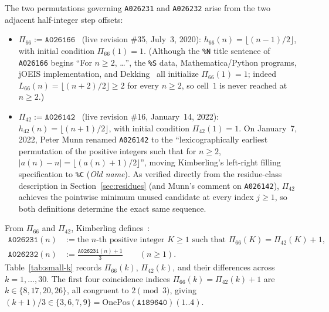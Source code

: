\documentclass[11pt]{article}
\theoremstyle{definition}
\newcommand{\seq}[1]{\texttt{#1}}
\newcommand{\OnePos}{\mathrm{OnePos}}
\begin{document}
The two permutations governing \seq{A026231} and \seq{A026232} arise from the two adjacent half-integer step offsets:
\begin{itemize}
\item $\Pi_{66} := \seq{A026166}$~\cite{oeis026166} (live revision \#35, July~3, 2020): $h_{66}(n) = \lfloor (n - 1)/2 \rfloor$, with initial condition $\Pi_{66}(1) = 1$. (Although the \texttt{\%N} title sentence of \seq{A026166} begins ``For $n \ge 2$, \dots'', the \texttt{\%S} data, Mathematica/Python programs, jOEIS implementation, and Dekking~\cite[§1]{dekking2020} all initialize $\Pi_{66}(1) = 1$; indeed $L_{66}(n) = \lfloor (n+2)/2 \rfloor \ge 2$ for every $n \ge 2$, so cell~$1$ is never reached at $n \ge 2$.)
\item $\Pi_{42} := \seq{A026142}$~\cite{oeis026142} (live revision \#16, January~14, 2022): $h_{42}(n) = \lfloor (n + 1)/2 \rfloor$, with initial condition $\Pi_{42}(1) = 1$. On January~7, 2022, Peter Munn renamed \seq{A026142} to the ``lexicographically earliest permutation of the positive integers such that for $n \ge 2$, $|a(n) - n| = \lfloor (a(n)+1)/2 \rfloor$'', moving Kimberling's left-right filling specification to \texttt{\%C} (\emph{Old name}). As verified directly from the residue-class description in Section~\ref{sec:residues} (and Munn's comment on \seq{A026142}), $\Pi_{42}$ achieves the pointwise minimum unused candidate at every index $j \ge 1$, so both definitions determine the exact same sequence.
\end{itemize}
From $\Pi_{66}$ and $\Pi_{42}$, Kimberling defines~\cite{oeis026231,oeis026232}:
\begin{align}
\seq{A026231}(n) &:= \text{the $n$-th positive integer $K \ge 1$ such that } \Pi_{66}(K) = \Pi_{42}(K) + 1, \label{eq:def231} \\
\seq{A026232}(n) &:= \frac{\seq{A026231}(n) + 1}{3} \qquad (n \ge 1). \label{eq:def232}
\end{align}
Table~\ref{tab:small-k} records $\Pi_{66}(k)$, $\Pi_{42}(k)$, and their differences across $k = 1, \dots, 30$. The first four coincidence indices $\Pi_{66}(k) = \Pi_{42}(k) + 1$ are $k \in \{8, 17, 20, 26\}$, all congruent to $2 \pmod{3}$, giving $(k+1)/3 \in \{3, 6, 7, 9\} = \OnePos(\seq{A189640})(1..4)$.
\end{document}
